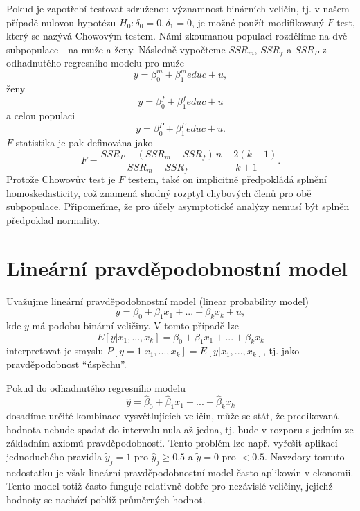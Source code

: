 Pokud je zapotřebí testovat sdruženou významnost binárních 
veličin, tj. v našem případě nulovou hypotézu $H_0: \delta_0 = 0, 
\delta_1 = 0$, je možné použít modifikovaný $F$ test, který se 
nazývá Chowovým testem. Námi zkoumanou populaci rozdělíme na dvě 
subpopulace - na muže a ženy. Následně vypočteme $SSR_m$, $SSR_f$ 
a $SSR_P$ z odhadnutého regresního modelu pro muže
\begin{equation}
y = \beta_0^m + \beta_1^m educ + u,
\end{equation}
ženy
\begin{equation}
y = \beta_0^f + \beta_1^f educ + u
\end{equation}
a celou populaci
\begin{equation}
y = \beta_0^P + \beta_1^P educ + u.
\end{equation}
$F$ statistika je pak definována jako
\begin{equation}
F = \frac{SSR_P - (SSR_m + SSR_f)}{SSR_m + SSR_f} \frac{n - 2(k + 1)}{k 
+ 1}.
\end{equation}
Protože Chowovův test je $F$ testem, také on implicitně 
předpokládá splnění homoskedasticity, což znamená shodný rozptyl 
chybových členů pro obě subpopulace. Připomeňme, že pro účely asymptotické analýzy nemusí být 
splněn předpoklad normality.

\section{Lineární pravděpodobnostní model}

Uvažujme lineární pravděpodobnostní model (linear probability model)
\begin{equation}
y = \beta_0 + \beta_1 x_1 + ... + \beta_k x_k + u,
\end{equation}
kde $y$ má podobu binární veličiny. V tomto případě lze
\begin{equation}
E[y|x_1, ..., x_k] = \beta_0 + \beta_1 x_1 + ... + \beta_k x_k
\end{equation}
interpretovat je smyslu $P[y = 1|x_1, ..., x_k] = E[y | x_1, ..., 
x_k]$, tj. jako pravděpodobnost ``úspěchu''.

Pokud do odhadnutého regresního modelu
\begin{equation}
\hat{y} = \hat{\beta}_0 + \hat{\beta}_1 x_1 + ... + \hat{\beta}_k x_k
\end{equation}
dosadíme určité kombinace vysvětlujících veličin, může se 
stát, že predikovaná hodnota nebude spadat do intervalu nula až 
jedna, tj. bude v rozporu s jedním ze základním axiomů 
pravděpodobnosti. Tento problém lze např. vyřešit aplikací 
jednoduchého pravidla $\tilde{y}_j = 1$ pro $\hat{y}_j \ge 0.5$ a 
$\tilde{y} = 0$ pro $< 0.5$. Navzdory tomuto nedostatku je však lineární 
pravděpodobnostní model často aplikován v ekonomii. Tento model totiž 
často funguje relativně dobře pro nezávislé veličiny, jejichž 
hodnoty se nachází poblíž průměrných hodnot.

